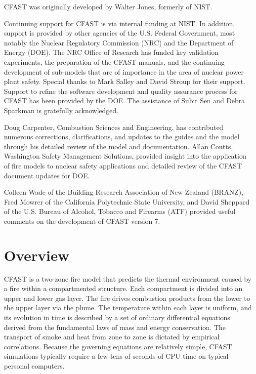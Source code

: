 \documentclass[12pt]{book}
\begin{document}
\label{acksection}

CFAST was originally developed by Walter Jones, formerly of NIST.

Continuing support for CFAST is via internal funding at NIST. In addition, support is provided by other agencies of the U.S. Federal Government, most notably the Nuclear Regulatory Commission (NRC) and the Department of Energy (DOE). The NRC Office of Research has funded key validation experiments, the preparation of the CFAST manuals, and the continuing development of sub-models that are of importance in the area of nuclear power plant safety. Special thanks to Mark Salley and David Stroup for their support. Support to refine the software development and quality assurance process for CFAST has been provided by the DOE. The assistance of Subir Sen and Debra Sparkman is gratefully acknowledged.

Doug Carpenter, Combustion Sciences and Engineering, has contributed numerous corrections, clarifications, and updates to the guides and the model through his detailed review of the model and documentation. Allan Coutts, Washington Safety Management Solutions, provided insight into the application of fire models to nuclear safety applications and detailed review of the CFAST document updates for DOE.

Colleen Wade of the Building Research Association of New Zealand (BRANZ), Fred Mowrer of the California Polytechnic State University, and David Sheppard of the U.S. Bureau of Alcohol, Tobacco and Firearms (ATF) provided useful comments on the development of CFAST version 7.


\tableofcontents

\listoffigures


\mainmatter

\chapter{Overview}

CFAST is a two-zone fire model that predicts the thermal environment caused by a fire within a compartmented structure. Each compartment is divided into an upper and lower gas layer. The fire drives combustion products from the lower to the upper layer via the plume. The temperature within each layer is uniform, and its evolution in time is described by a set of ordinary differential equations derived from the fundamental laws of mass and energy conservation. The transport of smoke and heat from zone to zone is dictated by empirical correlations. Because the governing equations are relatively simple, CFAST simulations typically require a few tens of seconds of CPU time on typical personal computers.
\end{document}
